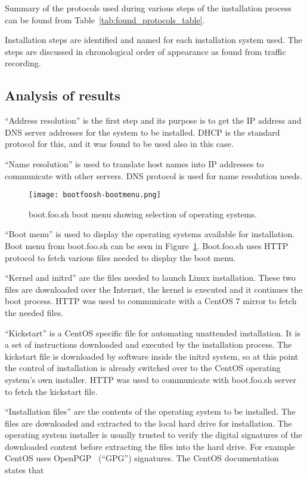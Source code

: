 Summary of the protocols used during various steps of the installation
process can be found from Table~\ref{tab:found_protocols_table}.

Installation steps are identified and named for each installation
system used. The steps are discussed in chronological order of
appearance as found from traffic recording.

\subsection{Analysis of results}

``Address resolution'' is the first step and its purpose is to get the
IP address and DNS server addresses for the system to be
installed. DHCP is the standard protocol for this, and it was found to
be used also in this case.

``Name resolution'' is used to translate host names into IP addresses
to communicate with other servers. DNS protocol is used for name
resolution needs.

\begin{figure}[h]
  \caption{boot.foo.sh boot menu showing selection of operating
    systems.\label{fig:bootmenu}}
  \texttt{[image: bootfoosh-bootmenu.png]}
\end{figure}

``Boot menu'' is used to display the operating systems available for
installation. Boot menu from boot.foo.sh can be seen in
Figure~\ref{fig:bootmenu}. Boot.foo.sh uses HTTP protocol to fetch
various files needed to display the boot menu.

``Kernel and initrd'' are the files needed to launch Linux
installation. These two files are downloaded over the Internet, the
kernel is executed and it continues the boot process. HTTP was used to
communicate with a CentOS 7 mirror to fetch the needed files.

``Kickstart'' is a CentOS specific file for automating unattended
installation. It is a set of instructions downloaded and executed by
the installation process. The kickstart file is downloaded by software
inside the initrd system, so at this point the control of installation
is already switched over to the CentOS operating system's own
installer. HTTP was used to communicate with boot.foo.sh server to
fetch the kickstart file.

``Installation files'' are the contents of the operating system to be
installed. The files are downloaded and extracted to the local hard
drive for installation. The operating system installer is usually
trusted to verify the digital signatures of the downloaded content
before extracting the files into the hard drive. For example CentOS
uses OpenPGP~\cite{RFC4880} (``GPG'') signatures. The CentOS
documentation~\cite{centos-gpg} states that

